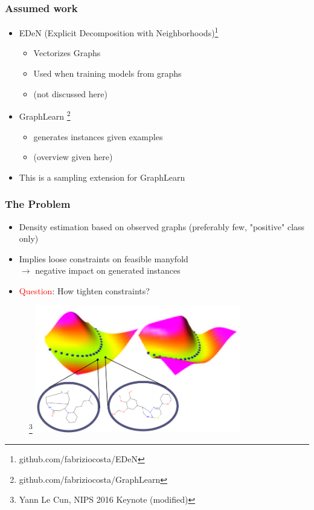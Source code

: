 \documentclass{beamer}
\newcommand{\red}[1]{\textcolor{red}{#1}}
\begin{document}
\begin{frame}
\frametitle{Assumed work}
    \begin{itemize}
        \item EDeN (Explicit Decomposition with Neighborhoods)\footnote{github.com/fabriziocosta/EDeN}
        \begin{itemize}
            \item Vectorizes Graphs
            \item Used when training models from graphs
            \item (not discussed here)
        \end{itemize}    
    
    \item GraphLearn \footnote{github.com/fabriziocosta/GraphLearn} 
        \begin{itemize}
            \item generates instances given examples
            \item (overview given here)
        \end{itemize}    
        \item This is a sampling extension for GraphLearn
    \end{itemize}    

\end{frame}
\begin{frame}
\frametitle{The Problem}
    \begin{itemize}
        \item Density estimation based on observed graphs (preferably few, "positive"
            class only)
        \item Implies loose constraints on feasible manyfold\\
            $\rightarrow$ negative impact on generated instances
        \item \red{Question}: How tighten constraints?
    \end{itemize}
    \begin{figure}[ht]
        \centering
        \footnote{ Yann Le Cun, NIPS 2016 Keynote (modified)}
        \includegraphics[width=0.8\textwidth]{images/valley.png}
    \end{figure}    
\end{frame}
\end{document}
